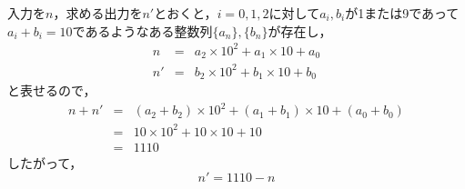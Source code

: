 \documentclass{article}
\begin{document}
入力を$n$，求める出力を$n'$とおくと，$i = 0, 1, 2$に対して$a_i, b_i$が1または9であって$a_i + b_i = 10$であるようなある整数列$\{a_n\}, \{b_n\}$が存在し，
\begin{eqnarray*}
    n  &=& a_2 \times 10^2 + a_1 \times 10 + a_0 \\
    n' &=& b_2 \times 10^2 + b_1 \times 10 + b_0
\end{eqnarray*}
と表せるので，
\begin{eqnarray*}
    n + n' &=& (a_2 + b_2) \times 10^2 + (a_1 + b_1) \times 10 + (a_0 + b_0) \\
           &=& 10 \times 10^2 + 10 \times 10 + 10 \\
           &=& 1110
\end{eqnarray*}
したがって，
$$n' = 1110 - n$$
\end{document}
